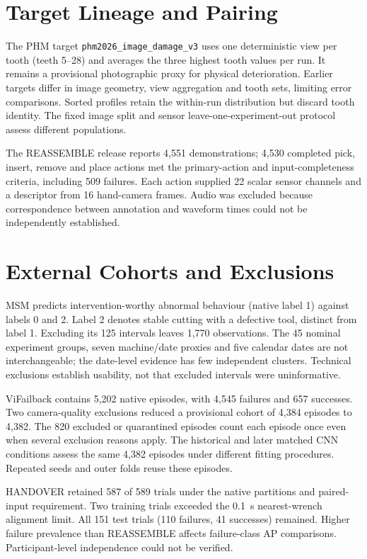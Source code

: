 \section{Target Lineage and Pairing}

The PHM target \nolinkurl{phm2026_image_damage_v3} uses one deterministic view per
tooth (teeth 5--28) and averages the three highest tooth values per run. It remains a
provisional photographic proxy for physical deterioration. Earlier targets differ in
image geometry, view aggregation and tooth sets, limiting error comparisons. Sorted
profiles retain the within-run distribution but discard tooth identity. The fixed
image split and sensor leave-one-experiment-out protocol assess different populations.

The REASSEMBLE release reports 4,551 demonstrations; 4,530 completed pick, insert,
remove and place actions met the primary-action and input-completeness criteria,
including 509 failures. Each action supplied 22 scalar sensor channels and a descriptor
from 16 hand-camera frames. Audio was excluded because correspondence between
annotation and waveform times could not be independently established.

\section{External Cohorts and Exclusions}

MSM predicts intervention-worthy abnormal behaviour (native label 1) against labels 0
and 2. Label 2 denotes stable cutting with a defective tool, distinct from label 1.
Excluding its 125 intervals leaves 1,770 observations. The 45 nominal experiment
groups, seven machine/date proxies and five calendar dates are not interchangeable;
the date-level evidence has few independent clusters. Technical exclusions establish
usability, not that excluded intervals were uninformative.

ViFailback contains 5,202 native episodes, with 4,545 failures and 657 successes. Two
camera-quality exclusions reduced a provisional cohort of 4,384 episodes to 4,382. The
820 excluded or quarantined episodes count each episode once even when several exclusion
reasons apply. The historical and later matched CNN conditions assess the same 4,382
episodes under different fitting procedures. Repeated seeds and outer folds reuse these
episodes.

HANDOVER retained 587 of 589 trials under the native partitions and paired-input
requirement. Two training trials exceeded the 0.1~s nearest-wrench alignment limit.
All 151 test trials (110 failures, 41 successes) remained. Higher failure prevalence
than REASSEMBLE affects failure-class AP comparisons. Participant-level independence
could not be verified.
